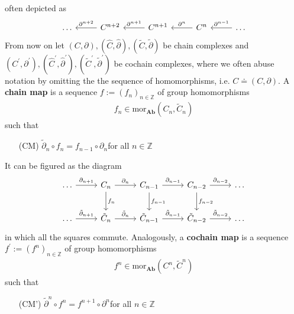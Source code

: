 often depicted as
\begin{equation*}
\begin{tikzcd}[row sep=2.2em,column sep=2.6em]
  \ldots
  &
  C^{n+2}
  \ar{l}[swap]{\partial^{n+2}}
  &
  C^{n+1}
  \ar{l}[swap]{\partial^{n+1}}
  &
  C^{n}
  \ar{l}[swap]{\partial^{n}}
  &
  \ldots
  \ar{l}[swap]{\partial^{n-1}}
\end{tikzcd}
\end{equation*}
From now on let $(C,\partial),(\hat{C},\hat{\partial}),(\tilde{C},\tilde{\partial})$ be chain complexes and $(C^{\prime},\partial^{\prime}),(\hat{C}^{\prime},\hat{\partial}^{\prime}),(\tilde{C}^{\prime},\tilde{\partial}^{\prime})$ be cochain complexes, where we often abuse notation by omitting the the sequence of homomorphisms, i.e. $C \doteq (C,\partial)$. A \textbf{chain map} is a sequence $f := (f_{n})_{n\in\mathbb{Z}}$ of group homomorphisms
\begin{align*}
  f_{n}
  \in
  \mathrm{mor}_{\mathbf{Ab}}(C_{n},\tilde{C}_{n})
\end{align*}
such that
\begin{enumerate}
\item[(CM)]
$\tilde{\partial}_{n} \circ f_{n} = f_{n-1} \circ \partial_{n}$\qquad for all $n \in \mathbb{Z}$
\end{enumerate}
It can be figured as the diagram
\begin{equation*}
\begin{tikzcd}[row sep=2.2em,column sep=2.6em]
  \ldots
  \ar{r}{\partial_{n+1}}
  &
  C_{n}
  \ar{r}{\partial_{n}}
  \ar{d}{f_{n}}
  &
  C_{n-1}
  \ar{r}{\partial_{n-1}}
  \ar{d}{f_{n-1}}
  &
  C_{n-2}
  \ar{r}{\partial_{n-2}}
  \ar{d}{f_{n-2}}
  &
  \ldots
  \\
  \ldots
  \ar{r}{\tilde{\partial}_{n+1}}
  &
  \tilde{C}_{n}
  \ar{r}{\tilde{\partial}_{n}}
  &
  \tilde{C}_{n-1}
  \ar{r}{\tilde{\partial}_{n-1}}
  &
  \tilde{C}_{n-2}
  \ar{r}{\tilde{\partial}_{n-2}}
  &
  \ldots
\end{tikzcd}
\end{equation*}
in which all the squares commute. Analogously, a \textbf{cochain map} is a sequence $f^{\prime} := (f^{n})_{n\in\mathbb{Z}}$ of group homomorphisms
\begin{align*}
  f^{n}
  \in
  \mathrm{mor}_{\mathbf{Ab}}(C^{n},\tilde{C}^{n})
\end{align*}
such that
\begin{enumerate}
\item[(CM')]
$\tilde{\partial}^{n} \circ f^{n} = f^{n+1} \circ \partial^{n}$\qquad for all $n \in \mathbb{Z}$
\end{enumerate}
